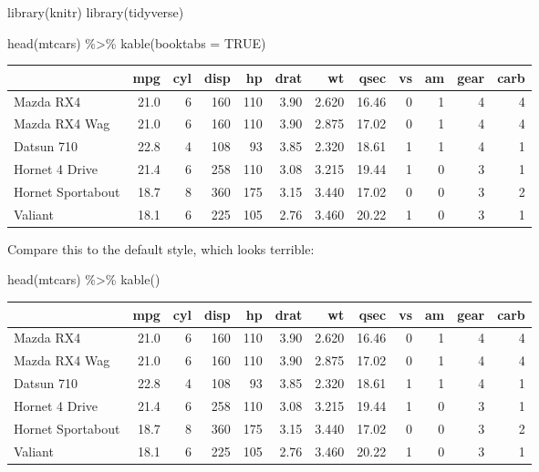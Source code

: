 \documentclass[a4paper, twoside]{templates/ociamthesis}
\newenvironment{Shaded}{\begin{snugshade}}{\end{snugshade}}
\newcommand{\AttributeTok}[1]{\textcolor[rgb]{0.77,0.63,0.00}{#1}}
\newcommand{\ConstantTok}[1]{\textcolor[rgb]{0.00,0.00,0.00}{#1}}
\newcommand{\FunctionTok}[1]{\textcolor[rgb]{0.00,0.00,0.00}{#1}}
\newcommand{\NormalTok}[1]{#1}
\newcommand{\SpecialCharTok}[1]{\textcolor[rgb]{0.00,0.00,0.00}{#1}}
\renewenvironment{Shaded}
{
  \vspace{10pt}%
  \begin{snugshade}%
}{%
  \end{snugshade}%
  \vspace{8pt}%
}
\begin{document}
\begin{Shaded}
\begin{Highlighting}[]
\FunctionTok{library}\NormalTok{(knitr)}
\FunctionTok{library}\NormalTok{(tidyverse)}

\FunctionTok{head}\NormalTok{(mtcars) }\SpecialCharTok{\%\textgreater{}\%} 
  \FunctionTok{kable}\NormalTok{(}\AttributeTok{booktabs =} \ConstantTok{TRUE}\NormalTok{)}
\end{Highlighting}
\end{Shaded}

\begin{tabular}{lrrrrrrrrrrr}
\toprule
  & mpg & cyl & disp & hp & drat & wt & qsec & vs & am & gear & carb\\
\midrule
Mazda RX4 & 21.0 & 6 & 160 & 110 & 3.90 & 2.620 & 16.46 & 0 & 1 & 4 & 4\\
Mazda RX4 Wag & 21.0 & 6 & 160 & 110 & 3.90 & 2.875 & 17.02 & 0 & 1 & 4 & 4\\
Datsun 710 & 22.8 & 4 & 108 & 93 & 3.85 & 2.320 & 18.61 & 1 & 1 & 4 & 1\\
Hornet 4 Drive & 21.4 & 6 & 258 & 110 & 3.08 & 3.215 & 19.44 & 1 & 0 & 3 & 1\\
Hornet Sportabout & 18.7 & 8 & 360 & 175 & 3.15 & 3.440 & 17.02 & 0 & 0 & 3 & 2\\
\addlinespace
Valiant & 18.1 & 6 & 225 & 105 & 2.76 & 3.460 & 20.22 & 1 & 0 & 3 & 1\\
\bottomrule
\end{tabular}

\vspace{4mm}

Compare this to the default style, which looks terrible:

\begin{Shaded}
\begin{Highlighting}[]
\FunctionTok{head}\NormalTok{(mtcars) }\SpecialCharTok{\%\textgreater{}\%} 
  \FunctionTok{kable}\NormalTok{()}
\end{Highlighting}
\end{Shaded}

\begin{tabular}{l|r|r|r|r|r|r|r|r|r|r|r}
\hline
  & mpg & cyl & disp & hp & drat & wt & qsec & vs & am & gear & carb\\
\hline
Mazda RX4 & 21.0 & 6 & 160 & 110 & 3.90 & 2.620 & 16.46 & 0 & 1 & 4 & 4\\
\hline
Mazda RX4 Wag & 21.0 & 6 & 160 & 110 & 3.90 & 2.875 & 17.02 & 0 & 1 & 4 & 4\\
\hline
Datsun 710 & 22.8 & 4 & 108 & 93 & 3.85 & 2.320 & 18.61 & 1 & 1 & 4 & 1\\
\hline
Hornet 4 Drive & 21.4 & 6 & 258 & 110 & 3.08 & 3.215 & 19.44 & 1 & 0 & 3 & 1\\
\hline
Hornet Sportabout & 18.7 & 8 & 360 & 175 & 3.15 & 3.440 & 17.02 & 0 & 0 & 3 & 2\\
\hline
Valiant & 18.1 & 6 & 225 & 105 & 2.76 & 3.460 & 20.22 & 1 & 0 & 3 & 1\\
\hline
\end{tabular}
\end{document}
